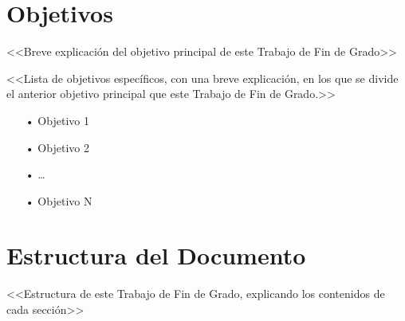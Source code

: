 
\section{Objetivos} \label{sct:intro:objetivos}

<<Breve explicación del objetivo principal de este Trabajo de Fin de Grado>>

<<Lista de objetivos específicos, con una breve explicación, en los que se divide el anterior objetivo principal que este Trabajo de Fin de Grado.>>

\begin{itemize}

    \item[•] Objetivo 1

    \item[•] Objetivo 2

    \item[•] \ldots

    \item[•] Objetivo N

\end{itemize}


\section{Estructura del Documento} \label{sct:intro_estructura}

<<Estructura de este Trabajo de Fin de Grado, explicando los contenidos de cada sección>>


